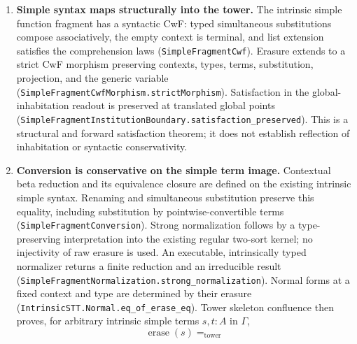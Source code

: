 \documentclass[11pt]{article}
\theoremstyle{definition}
\theoremstyle{remark}
\begin{document}
\begin{enumerate}
  simple-families institution to the dependent one, exact on its image
  (\nolinkurl{CwfSimpleDependentInstitution.entails_iff}); over an inhabited
  context, a family descends to a simple type exactly when it is constant
  (\nolinkurl{DependencyDescentCriterion.descends_iff_constant}); a simple
  theorem transports (\nolinkurl{identity_transports}); transport along a
  path in the varying family refutes the path $\mathsf{false}=\mathsf{true}$,
  and transport in the family of finite types has its computation rule at
  reflexivity while the family is not constant (\nolinkurl{no_path_false_true},
  \texttt{finTransport\_refl}, \nolinkurl{finFamily_not_constant}).  The
  cumulative tower's own syntax is a node with a satisfying model, the empty
  telescope witnessing $U_0 : U_1$ (\texttt{TowerTheoryNode}).
\item \textbf{Simple syntax maps structurally into the tower.}  The intrinsic
  simple function fragment has a syntactic CwF: typed simultaneous
  substitutions compose associatively, the empty context is terminal, and
  list extension satisfies the comprehension laws
  (\texttt{SimpleFragmentCwf}).  Erasure extends to a strict CwF morphism
  preserving contexts, types, terms, substitution, projection, and the generic
  variable (\nolinkurl{SimpleFragmentCwfMorphism.strictMorphism}).  Satisfaction
  in the global-inhabitation readout is preserved at translated global points
  (\nolinkurl{SimpleFragmentInstitutionBoundary.satisfaction_preserved}).
  This is a structural and forward satisfaction theorem; it does not establish
  reflection of inhabitation or syntactic conservativity.
\item \textbf{Conversion is conservative on the simple term image.}
  Contextual beta reduction and its equivalence closure are defined on the
  existing intrinsic simple syntax. Renaming and simultaneous substitution
  preserve this equality, including substitution by pointwise-convertible
  terms (\nolinkurl{SimpleFragmentConversion}). Strong normalization follows
  by a type-preserving interpretation into the existing regular two-sort kernel;
  no injectivity of raw erasure is used. An executable, intrinsically typed
  normalizer returns a finite reduction and an irreducible result
  (\nolinkurl{SimpleFragmentNormalization.strong_normalization}). Normal forms
  at a fixed context and type are determined by their erasure
  (\nolinkurl{IntrinsicSTT.Normal.eq_of_erase_eq}). Tower skeleton confluence
  then proves, for arbitrary intrinsic simple terms $s,t:\!A$ in $\Gamma$,
  \[
    \operatorname{erase}(s) =_{\mathrm{tower}}
\]
\end{enumerate}
\end{document}
